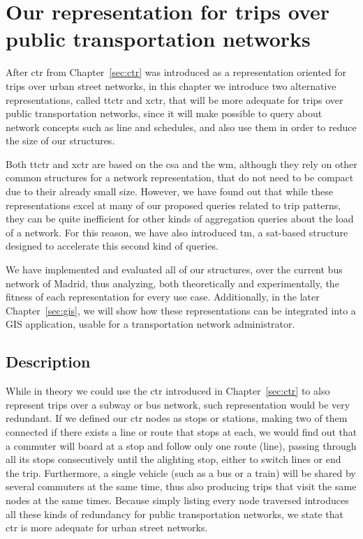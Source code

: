 \chapter{Our representation for trips over public transportation networks}
\label{sec:newctr}

	After \gls{ctr} from Chapter~\ref{sec:ctr} was introduced as a representation oriented for trips over urban street networks, in this chapter we introduce two alternative representations, called \gls{ttctr} and \gls{xctr}, that will be more adequate for trips over public transportation networks, since it will make possible to query about network concepts such as line and schedules, and also use them in order to reduce the size of our structures.
	
	Both \gls{ttctr} and \gls{xctr} are based on the \gls{csa}  and the \gls{wm}, although they rely on other common structures for a network representation, that do not need to be compact due to their already small size. However, we have found out that while these representations excel at many of our proposed queries related to trip patterns, they can be quite inefficient for other kinds of aggregation queries about the load of a network. For this reason, we have also introduced \gls{tm}, a \gls{sat}-based structure designed to accelerate this second kind of queries.
	
	We have implemented and evaluated all of our structures, over the current bus network of Madrid, thus analyzing, both theoretically and experimentally, the fitness of each representation for every use case. Additionally, in the later Chapter~\ref{sec:gis}, we will show how these representations can be integrated into a GIS application, usable for a transportation network administrator.
	
\section{Description}
    \label{sec:newctr:desc}
	While in theory we could use the \gls{ctr} introduced in Chapter~\ref{sec:ctr} to also represent trips over a subway or bus network, such representation would be very redundant. If we defined our \gls{ctr} nodes as stops or stations, making two of them connected if there exists a line or route that stops at each, we would find out that a commuter will board at a stop and follow only one route (line), passing through all its stops consecutively until the alighting stop, either to switch lines or end the trip. Furthermore, a single vehicle (such as a bus or a train) will be shared by several commuters at the same time, thus also producing trips that visit the same nodes at the same times. Because simply listing every node traversed introduces all these kinds of redundancy for public transportation networks, we state that \gls{ctr} is more adequate for urban street networks.
	
